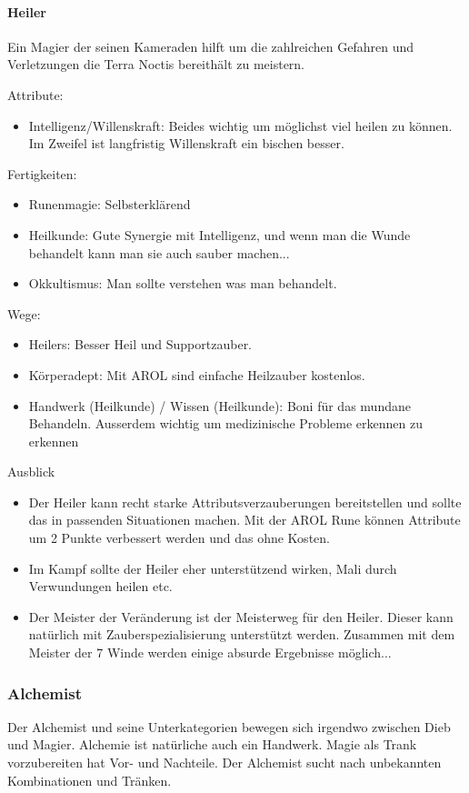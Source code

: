 \documentclass{article}
\begin{document}
\paragraph{Heiler}
Ein Magier der seinen Kameraden hilft um die zahlreichen Gefahren und Verletzungen die Terra Noctis bereithält zu
meistern.

Attribute:
\begin{itemize}
\item Intelligenz/Willenskraft: Beides wichtig um möglichst viel heilen zu können. Im Zweifel ist langfristig Willenskraft ein bischen besser.
\end{itemize}

Fertigkeiten:
\begin{itemize}
\item Runenmagie: Selbsterklärend
\item Heilkunde: Gute Synergie mit Intelligenz, und wenn man die Wunde behandelt kann man sie auch sauber machen...
\item Okkultismus: Man sollte verstehen was man behandelt.
\end{itemize}

Wege:
\begin{itemize}
\item Heilers: Besser Heil und Supportzauber.
\item Körperadept: Mit AROL sind einfache Heilzauber kostenlos.
\item Handwerk (Heilkunde) / Wissen (Heilkunde): Boni für das mundane Behandeln. Ausserdem wichtig um medizinische Probleme erkennen zu erkennen
\end{itemize}

Ausblick
\begin{itemize}
\item Der Heiler kann recht starke Attributsverzauberungen bereitstellen und sollte das in passenden Situationen machen. Mit der AROL Rune können Attribute um 2 Punkte verbessert werden und das ohne Kosten.
\item Im Kampf sollte der Heiler eher unterstützend wirken, Mali durch Verwundungen heilen etc.
\item Der Meister der Veränderung ist der Meisterweg für den Heiler. Dieser kann natürlich mit Zauberspezialisierung unterstützt werden. Zusammen mit dem Meister der 7 Winde werden einige absurde Ergebnisse möglich...
\end{itemize}

\subsubsection{Alchemist}
Der Alchemist und seine Unterkategorien bewegen sich irgendwo zwischen Dieb und Magier. Alchemie ist natürliche auch
ein Handwerk. Magie als Trank vorzubereiten hat Vor- und Nachteile. Der Alchemist sucht nach unbekannten Kombinationen
und Tränken.
\end{document}
